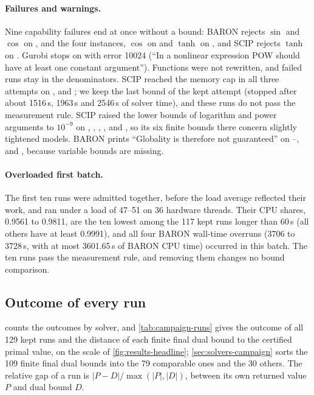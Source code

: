 \paragraph{Failures and warnings.}
Nine capability failures end at once without a bound: BARON rejects $\sin$ and $\cos$ on ,  and the four  instances, $\cos$ on  and $\tanh$ on , and SCIP rejects $\tanh$ on .
Gurobi stops on  with error 10024 (``In a nonlinear expression POW should have at least one constant argument'').
Functions were not rewritten, and failed runs stay in the denominators.
SCIP reached the memory cap in all three attempts on ,  and ; we keep the last bound of the kept attempt (stopped after about 1516\,s, 1963\,s and 2546\,s of solver time), and these runs do not pass the measurement rule.
SCIP raised the lower bounds of logarithm and power arguments to $10^{-9}$ on , , , ,  and , so its six finite bounds there concern slightly tightened models.
BARON prints ``Globality is therefore not guaranteed'' on --,  and , because variable bounds are missing.

\paragraph{Overloaded first batch.}
The first ten runs were admitted together, before the load average reflected their work, and ran under a load of 47--51 on 36 hardware threads.
Their CPU shares, 0.9561 to 0.9811, are the ten lowest among the 117 kept runs longer than 60\,s (all others have at least 0.9991), and all four BARON wall-time overruns (3706 to 3728\,s, with at most 3601.65\,s of BARON CPU time) occurred in this batch.
The ten runs pass the measurement rule, and removing them changes no bound comparison.

\subsection{Outcome of every run}\label{app:solvers-runs}

 counts the outcomes by solver, and \cref{tab:campaign-runs} gives the outcome of all 129 kept runs and the distance of each finite final dual bound to the certified primal value, on the scale of \cref{fig:results-headline}; \cref{sec:solvers-campaign} sorts the 109 finite final dual bounds into the 79 comparable ones and the 30 others.
The relative gap of a run is $|P-D|/\max(|P|,|D|)$, between its own returned value $P$ and dual bound $D$.

